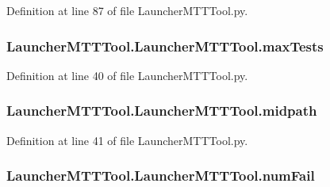 Definition at line 87 of file Launcher\-M\-T\-T\-Tool.\-py.

\hypertarget{class_launcher_m_t_t_tool_1_1_launcher_m_t_t_tool_aa8e59ca462ace6b189cd849a08afa639}{
\subsubsection[{max\-Tests}]{\setlength{\rightskip}{0pt plus 5cm}Launcher\-M\-T\-T\-Tool.\-Launcher\-M\-T\-T\-Tool.\-max\-Tests}}\label{class_launcher_m_t_t_tool_1_1_launcher_m_t_t_tool_aa8e59ca462ace6b189cd849a08afa639}


Definition at line 40 of file Launcher\-M\-T\-T\-Tool.\-py.

\hypertarget{class_launcher_m_t_t_tool_1_1_launcher_m_t_t_tool_a37f255feb0dac2f1eb0e6eff2746bd7b}{
\subsubsection[{midpath}]{\setlength{\rightskip}{0pt plus 5cm}Launcher\-M\-T\-T\-Tool.\-Launcher\-M\-T\-T\-Tool.\-midpath}}\label{class_launcher_m_t_t_tool_1_1_launcher_m_t_t_tool_a37f255feb0dac2f1eb0e6eff2746bd7b}


Definition at line 41 of file Launcher\-M\-T\-T\-Tool.\-py.

\hypertarget{class_launcher_m_t_t_tool_1_1_launcher_m_t_t_tool_a17fe6e6f8981cc1f7cd1953cac37668a}{
\subsubsection[{num\-Fail}]{\setlength{\rightskip}{0pt plus 5cm}Launcher\-M\-T\-T\-Tool.\-Launcher\-M\-T\-T\-Tool.\-num\-Fail}}\label{class_launcher_m_t_t_tool_1_1_launcher_m_t_t_tool_a17fe6e6f8981cc1f7cd1953cac37668a}


